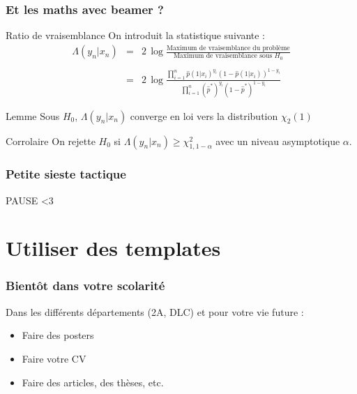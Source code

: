 \documentclass[handout]{beamer}
\begin{document}
\begin{frame}
	\frametitle{Et les maths avec beamer ?}
	\vspace{-0.2cm}
	\begin{block}{Ratio de vraisemblance}
	    On introduit la statistique suivante :
	    $$
	    \begin{array}{ccl}
	    \Lambda(y_n|x_n) & = & 2\, \log\frac{\mbox{Maximum de vraisemblance du problème}}{\mbox{Maximum de vraisemblance sous } H_0} \\
	    & & \\
	    & = & 2\,\log \frac{\prod_{i=1}^n \hat{p}(1|x_i)^{y_i}(1-\hat{p}(1|x_i))^{1-y_i}}{\prod_{i=1}^n (\hat{p}^*)^{y_i}(1-\hat{p}^*)^{1-y_i}}
	    \end{array}
	    $$
	\end{block}

	\begin{block}{Lemme}
		Sous $H_0$, $\Lambda(y_n|x_n)$ converge en loi vers la distribution $\chi_2(1)$
	\end{block}

	\begin{block}{Corrolaire}
		On rejette $H_0$ si $\Lambda(y_n|x_n) \geq \chi_{1,1-\alpha}^2$ avec un niveau asymptotique $\alpha$.
	\end{block}

\end{frame}

\begin{frame}
	\frametitle{Petite sieste tactique}
	\Huge
	\centering

	PAUSE <3
\end{frame}

\section{Utiliser des templates}

\begin{frame}
	\frametitle{Bientôt dans votre scolarité}
	\centering
	Dans les différents départements (2A, DLC) et pour votre vie future :\\
	\begin{itemize}
		\item Faire des posters
		\item Faire votre CV
		\item Faire des articles, des thèses, etc.
	\end{itemize}
\end{frame}
\end{document}
